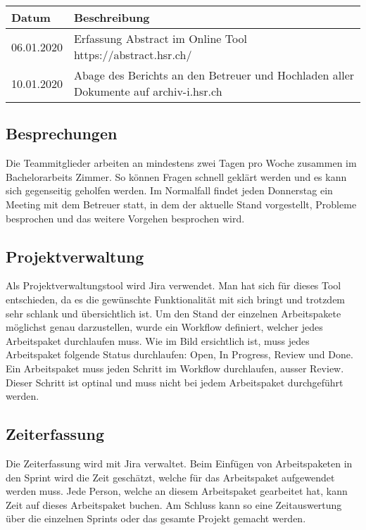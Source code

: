 \begin{center}
	\begin{tabularx}{\textwidth}{p{} p{}}
	\toprule
	Datum & Beschreibung \\ \midrule
	06.01.2020 & Erfassung Abstract im Online Tool https://abstract.hsr.ch/ \\
	10.01.2020 & Abage des Berichts an den Betreuer und Hochladen aller Dokumente auf archiv-i.hsr.ch \\ \bottomrule
	\end{tabularx}
\end{center}

\subsection{Besprechungen}
Die Teammitglieder arbeiten an mindestens zwei Tagen pro Woche zusammen im Bachelorarbeits Zimmer. So können Fragen schnell geklärt werden und es kann sich gegenseitig geholfen werden. Im Normalfall findet jeden Donnerstag ein Meeting mit dem Betreuer statt, in dem der aktuelle Stand vorgestellt, Probleme besprochen und das weitere Vorgehen besprochen wird.

\subsection{Projektverwaltung}
Als Projektverwaltungstool wird Jira verwendet. Man hat sich für dieses Tool entschieden, da es die gewünschte Funktionalität mit sich bringt und trotzdem sehr schlank und übersichtlich ist. Um den Stand der einzelnen Arbeitspakete möglichst genau darzustellen, wurde ein Workflow definiert, welcher jedes Arbeitspaket durchlaufen muss.
Wie im Bild ersichtlich ist, muss jedes Arbeitspaket folgende Status durchlaufen: Open, In Progress, Review und Done. Ein Arbeitspaket muss jeden Schritt im Workflow durchlaufen, ausser Review. Dieser Schritt ist optinal und muss nicht bei jedem Arbeitspaket durchgeführt werden.

\subsection{Zeiterfassung}
Die Zeiterfassung wird mit Jira verwaltet. Beim Einfügen von Arbeitspaketen in den Sprint wird die Zeit geschätzt, welche für das Arbeitspaket aufgewendet werden muss. Jede Person, welche an diesem Arbeitspaket gearbeitet hat, kann Zeit auf dieses Arbeitspaket buchen. Am Schluss kann so eine Zeitauswertung über die einzelnen Sprints oder das gesamte Projekt gemacht werden.

\newpage